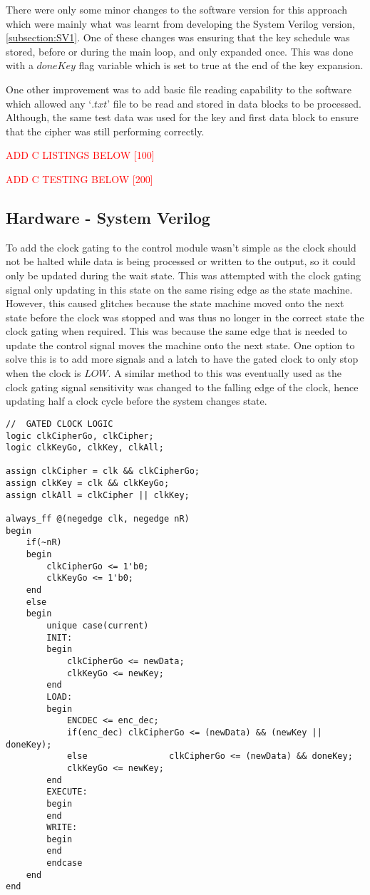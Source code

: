 \documentclass[12pt,twoside,a4paper]{report}
\begin{document}
	There were only some minor changes to the software version for this approach which were mainly what was learnt from developing the System Verilog version, \autoref{subsection:SV1}. One of these changes was ensuring that the key schedule was stored, before or during the main loop, and only expanded once. This was done with a $doneKey$ flag variable which is set to true at the end of the key expansion.
	
	One other improvement was to add basic file reading capability to the software which allowed any  `$.txt$' file to be read and stored in data blocks to be processed. Although, the same test data was used for the key and first data block to ensure that the cipher was still performing correctly.
	
	\textcolor{red}{ADD C LISTINGS BELOW [100]}
    
	\textcolor{red}{ADD C TESTING BELOW [200]}   
    
	\subsection{Hardware - System Verilog}
	\label{subsection:SV2}
	
	To add the clock gating to the control module wasn't simple as the clock should not be halted while data is being processed or written to the output, so it could only be updated during the wait state. This was attempted with the clock gating signal only updating in this state on the same rising edge as the state machine. However, this caused glitches because the state machine moved onto the next state before the clock was stopped and was thus no longer in the correct state the clock gating when required. This was because the same edge that is needed to update the control signal moves the machine onto the next state. One option to solve this is to add more signals and a latch to have the gated clock to only stop when the clock is $LOW$. A similar method to this was eventually used as the clock gating signal sensitivity was changed to the falling edge of the clock, hence updating half a clock cycle before the system changes state.

	\begin{minipage}{\linewidth}
	\begin{lstlisting}[label={lst:Clock_Gating},caption={The next state logic for the ($PRE$) control module},style=CStyle]
//	GATED CLOCK LOGIC
logic clkCipherGo, clkCipher;
logic clkKeyGo, clkKey, clkAll;

assign clkCipher = clk && clkCipherGo;
assign clkKey = clk && clkKeyGo;
assign clkAll = clkCipher || clkKey;

always_ff @(negedge clk, negedge nR)
begin
	if(~nR)
	begin
		clkCipherGo <= 1'b0;
		clkKeyGo <= 1'b0;
	end
	else
	begin
		unique case(current)
		INIT:
		begin
			clkCipherGo <= newData;
			clkKeyGo <= newKey;
		end
		LOAD:
		begin
			ENCDEC <= enc_dec;
			if(enc_dec)	clkCipherGo <= (newData) && (newKey || doneKey);
			else				clkCipherGo <= (newData) && doneKey;
			clkKeyGo <= newKey;
		end
		EXECUTE:
		begin
		end
		WRITE:
		begin
		end
		endcase
	end
end
	\end{lstlisting}
	\end{minipage}
	
\end{document}
